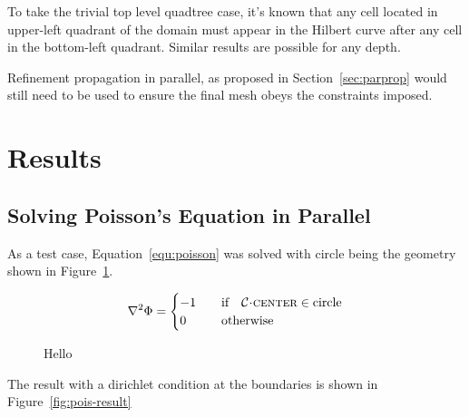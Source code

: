\documentclass[twoside]{IIBproject}
\newcommand{\acc}{{\mkern 0.5mu\cdot\mkern 0.5mu}}
\numberwithin{figure}{section}
\begin{document}
            To take the trivial top level quadtree case, it's known that any cell located in upper-left quadrant of the domain must appear in the Hilbert curve after any cell in the bottom-left quadrant. Similar results are possible for any depth. 

            Refinement propagation in parallel, as proposed in Section~\ref{sec:parprop} would still need to be used to ensure the final mesh obeys the constraints imposed. 
 




\section{Results} %
    \label{sec:results}

    \subsection{Solving Poisson's Equation in Parallel} %
        \label{sec:results-poissons}

        As a test case, Equation~\ref{equ:poisson} was solved with circle being the geometry shown in Figure~\ref{fig:pois-geometry}. 

        \begin{equation}
            \laplacian{\Phi}=\begin{cases}
                -1 & \qq{if} \mathcal{C}\acc\textproc{center} \in \text{circle} \\
                0 & \qq{otherwise}
            \end{cases}
            \label{equ:poisson}
        \end{equation}

        \begin{figure}[H]
            \centering
            \caption{Hello}
            \label{fig:pois-geometry}
        \end{figure}

        The result with a dirichlet condition at the boundaries is shown in Figure~\ref{fig:pois-result}
\end{document}
